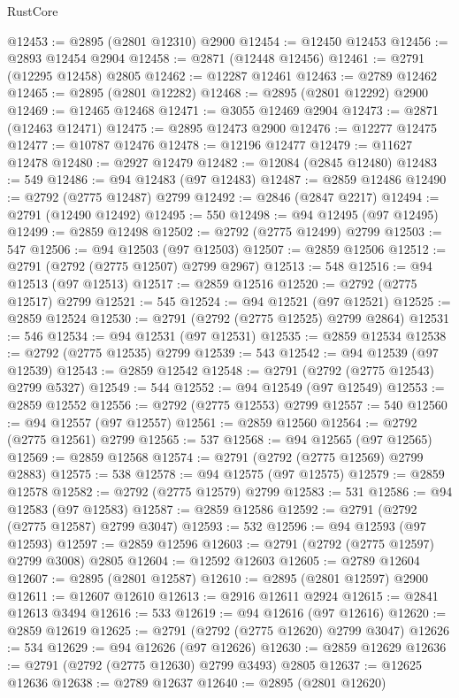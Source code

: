 \begin{lexlean}{RustCore}
\begin{coremodule}
@12453 := @2895 (@2801 @12310) @2900
@12454 := @12450 @12453
@12456 := @2893 @12454 @2904
@12458 := @2871 (@12448 @12456)
@12461 := @2791 (@12295 @12458) @2805
@12462 := @12287 @12461
@12463 := @2789 @12462
@12465 := @2895 (@2801 @12282)
@12468 := @2895 (@2801 @12292) @2900
@12469 := @12465 @12468
@12471 := @3055 @12469 @2904
@12473 := @2871 (@12463 @12471)
@12475 := @2895 @12473 @2900
@12476 := @12277 @12475
@12477 := @10787 @12476
@12478 := @12196 @12477
@12479 := @11627 @12478
@12480 := @2927 @12479
@12482 := @12084 (@2845 @12480)
@12483 := 549
@12486 := @94 @12483 (@97 @12483)
@12487 := @2859 @12486
@12490 := @2792 (@2775 @12487) @2799
@12492 := @2846 (@2847 @2217)
@12494 := @2791 (@12490 @12492)
@12495 := 550
@12498 := @94 @12495 (@97 @12495)
@12499 := @2859 @12498
@12502 := @2792 (@2775 @12499) @2799
@12503 := 547
@12506 := @94 @12503 (@97 @12503)
@12507 := @2859 @12506
@12512 := @2791 (@2792 (@2775 @12507) @2799 @2967)
@12513 := 548
@12516 := @94 @12513 (@97 @12513)
@12517 := @2859 @12516
@12520 := @2792 (@2775 @12517) @2799
@12521 := 545
@12524 := @94 @12521 (@97 @12521)
@12525 := @2859 @12524
@12530 := @2791 (@2792 (@2775 @12525) @2799 @2864)
@12531 := 546
@12534 := @94 @12531 (@97 @12531)
@12535 := @2859 @12534
@12538 := @2792 (@2775 @12535) @2799
@12539 := 543
@12542 := @94 @12539 (@97 @12539)
@12543 := @2859 @12542
@12548 := @2791 (@2792 (@2775 @12543) @2799 @5327)
@12549 := 544
@12552 := @94 @12549 (@97 @12549)
@12553 := @2859 @12552
@12556 := @2792 (@2775 @12553) @2799
@12557 := 540
@12560 := @94 @12557 (@97 @12557)
@12561 := @2859 @12560
@12564 := @2792 (@2775 @12561) @2799
@12565 := 537
@12568 := @94 @12565 (@97 @12565)
@12569 := @2859 @12568
@12574 := @2791 (@2792 (@2775 @12569) @2799 @2883)
@12575 := 538
@12578 := @94 @12575 (@97 @12575)
@12579 := @2859 @12578
@12582 := @2792 (@2775 @12579) @2799
@12583 := 531
@12586 := @94 @12583 (@97 @12583)
@12587 := @2859 @12586
@12592 := @2791 (@2792 (@2775 @12587) @2799 @3047)
@12593 := 532
@12596 := @94 @12593 (@97 @12593)
@12597 := @2859 @12596
@12603 := @2791 (@2792 (@2775 @12597) @2799 @3008) @2805
@12604 := @12592 @12603
@12605 := @2789 @12604
@12607 := @2895 (@2801 @12587)
@12610 := @2895 (@2801 @12597) @2900
@12611 := @12607 @12610
@12613 := @2916 @12611 @2924
@12615 := @2841 @12613 @3494
@12616 := 533
@12619 := @94 @12616 (@97 @12616)
@12620 := @2859 @12619
@12625 := @2791 (@2792 (@2775 @12620) @2799 @3047)
@12626 := 534
@12629 := @94 @12626 (@97 @12626)
@12630 := @2859 @12629
@12636 := @2791 (@2792 (@2775 @12630) @2799 @3493) @2805
@12637 := @12625 @12636
@12638 := @2789 @12637
@12640 := @2895 (@2801 @12620)

\end{coremodule}
\end{lexlean}
